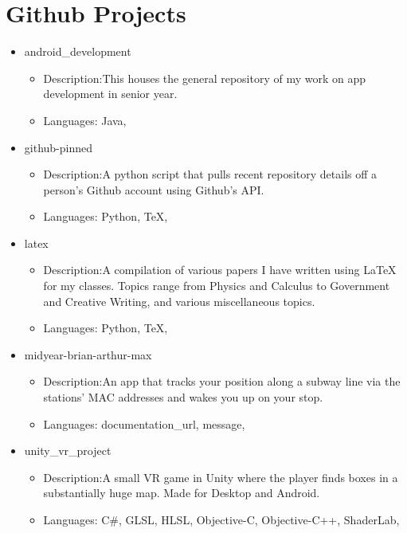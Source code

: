 \documentclass{article}%
\begin{document}
%
\normalsize%
%
\section{Github Projects}%
\label{sec:Github Projects}%
\begin{itemize}%
\item%
android\_development%
\begin{itemize}%
\item%
Description:This houses the general repository of my work on app development in senior year.%
\item%
Languages: Java, %
\end{itemize}%
\end{itemize}%
\begin{itemize}%
\item%
github{-}pinned%
\begin{itemize}%
\item%
Description:A python script that pulls recent repository details off a person's Github account using Github's API. %
\item%
Languages: Python, TeX, %
\end{itemize}%
\end{itemize}%
\begin{itemize}%
\item%
latex%
\begin{itemize}%
\item%
Description:A compilation of various papers I have written using LaTeX for my classes. Topics range from Physics and Calculus to Government and Creative Writing, and various miscellaneous topics. %
\item%
Languages: Python, TeX, %
\end{itemize}%
\end{itemize}%
\begin{itemize}%
\item%
midyear{-}brian{-}arthur{-}max%
\begin{itemize}%
\item%
Description:An app that tracks your position along a subway line via the stations' MAC addresses and wakes you up on your stop.%
\item%
Languages: documentation\_url, message, %
\end{itemize}%
\end{itemize}%
\begin{itemize}%
\item%
unity\_vr\_project%
\begin{itemize}%
\item%
Description:A small VR game in Unity where the player finds boxes in a substantially huge map. Made for Desktop and Android.%
\item%
Languages: C\#, GLSL, HLSL, Objective{-}C, Objective{-}C++, ShaderLab, %
\end{itemize}%
\end{itemize}

%
\end{document}
